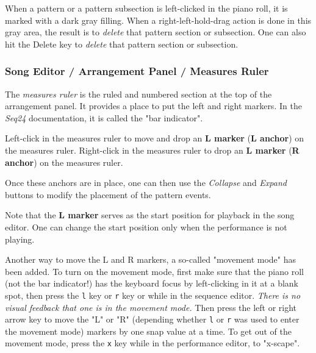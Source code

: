    When a pattern or a pattern subsection is left-clicked in the piano
   roll, it is marked with a dark gray filling.
   When a right-left-hold-drag action is done in this gray area, the result
   is to \textsl{delete} that pattern section or subsection.
   One can also hit the Delete key to \textsl{delete} that pattern section
   or subsection.

\subsubsection{Song Editor / Arrangement Panel / Measures Ruler}
\label{subsubsec:seq66_song_editor_arrangement_panel_measures_ruler}

   The \textsl{measures ruler} is the ruled and numbered section at the top
   of the arrangement panel.  It provides a place to put the left and right
   markers.  In the \textsl{Seq24} documentation, it is called the "bar
   indicator".

   Left-click in the measures ruler to move and drop an
   \textbf{L marker} (\textbf{L anchor}) on the measures ruler.
   Right-click in the measures ruler to drop an
   \textbf{L marker} (\textbf{R anchor}) on the measures ruler.

   Once these anchors are in place, one can then use
	the \textsl{Collapse} and \textsl{Expand} buttons to modify the
   placement of the pattern events.

   Note that the \textbf{L marker} serves as the start position for playback
   in the song editor.  One can change the start position only when the
   performance is not playing.

   Another way to move the L and R markers, a so-called "movement mode"
   has been added.
   To turn on the movement mode, first make sure that the piano roll (not the
   bar indicator!) has the
   keyboard focus by left-clicking in it at a blank spot, then press the
   \texttt{l} key or
   \texttt{r} key or
   while in the sequence editor.
   \textsl{There is no visual feedback that one is in the movement mode.}
   Then press the left or right arrow key to move the "L" or "R" (depending
   whether \texttt{l} or \texttt{r} was used to enter the movement mode)
   markers by one snap value at a time.
   To get out of the movement mode, press the
   \texttt{x} key while in the performance editor, to "x-scape".

